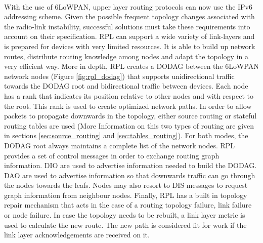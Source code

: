 \paragraph{}
With the use of 6LoWPAN, upper layer routing protocols can now use the IPv6 addressing scheme. Given the possible frequent topology changes associated with the radio-link instability, successful  solutions must take these requirements into account on their specification. \gls{RPL} \cite{Winter2012} can support a wide variety of link-layers and is prepared for devices with very limited resources. It is able to build up network routes, distribute routing knowledge among nodes and adapt the topology in a very efficient way. More in depth, \gls{RPL} creates a \gls{DODAG} between the 6LoWPAN network nodes (Figure \ref{fig:rpl_dodag}) that supports unidirectional traffic towards the \gls{DODAG} root and bidirectional traffic between devices. Each node has a rank that indicates its position relative to other nodes and with respect to the root. This rank is used to create optimized network paths. In order to allow packets to propagate downwards in the topology, either source routing or stateful routing tables are used (More Information on this two types of routing are given in sections \ref{sec:source_routing} and \ref{sec:tables_routing}). For both modes, the \gls{DODAG} root always maintains a complete list of the network nodes. \gls{RPL} provides a set of control messages in order to exchange routing graph information. \gls{DIO} are used to advertise information needed to build the \gls{DODAG}. \gls{DAO}  are used to advertise information so that downwards traffic can go through the nodes towards the leafs. Nodes may also resort to \gls{DIS} messages to request graph information from neighbour nodes. Finally, RPL has a built in topology repair mechanism that acts in the case of a routing topology failure, link failure or node failure. In case the topology needs to be rebuilt, a link layer metric is used to calculate the new route. The new path is considered fit for work if the link layer acknowledgements are received on it.

